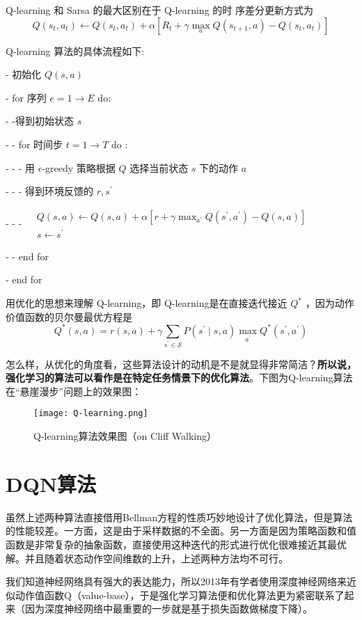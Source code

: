 Q-learning 和 Sarsa 的最大区别在于 Q-learning 的时 序差分更新方式为
$$
Q\left(s_{t}, a_{t}\right) \leftarrow Q\left(s_{t}, a_{t}\right)+\alpha\left[R_{t}+\gamma \max _{a} Q\left(s_{t+1}, a\right)-Q\left(s_{t}, a_{t}\right)\right]
$$

Q-learning 算法的具体流程如下:

- 初始化 $Q(s, a)$

- for 序列 $e=1 \rightarrow E$ do:

- -得到初始状态 $s$

- - for 时间步 $t=1 \rightarrow T$ do :

- - - 用 $\epsilon$-greedy 策略根据 $Q$ 选择当前状态 $s$ 下的动作 $a$

- - - 得到环境反馈的 $r, s^{\prime}$

- - - $\begin{array}{ll} & Q(s, a) \leftarrow Q(s, a)+\alpha\left[r+\gamma \max _{a^{\prime}} Q\left(s^{\prime}, a^{\prime}\right)-Q(s, a)\right] \\ & s \leftarrow s^{\prime}\end{array}$

- - end for

- end for

用优化的思想来理解 Q-learning，即 Q-learning是在直接迭代接近 $Q^{*}$ ，因为动作价值函数的贝尔曼最优方程是
$$
Q^{*}(s, a)=r(s, a)+\gamma \sum_{s^{\prime} \in \mathcal{S}} P\left(s^{\prime} \mid s, a\right) \max _{a^{\prime}} Q^{*}\left(s^{\prime}, a^{\prime}\right)
$$

怎么样，从优化的角度看，这些算法设计的动机是不是就显得非常简洁？\textbf{所以说，强化学习的算法可以看作是在特定任务情景下的优化算法}。下图为Q-learning算法在“悬崖漫步”问题上的效果图：
\begin{figure}[hbt]
    \centering
    \texttt{[image: Q-learning.png]}
	\vspace{-0.5cm}
    \caption{Q-learning算法效果图（on Cliff Walking）}
    \label{Q-learning}
\end{figure}
\section{DQN算法}
虽然上述两种算法直接借用Bellman方程的性质巧妙地设计了优化算法，但是算法的性能较差。一方面，这是由于采样数据的不全面。另一方面是因为策略函数和值函数是非常复杂的抽象函数，直接使用这种迭代的形式进行优化很难接近其最优解。并且随着状态动作空间维数的上升，上述两种方法均不可行。

我们知道神经网络具有强大的表达能力，所以2013年有学者使用深度神经网络来近似动作值函数Q（value-base），于是强化学习算法便和优化算法更为紧密联系了起来（因为深度神经网络中最重要的一步就是基于损失函数做梯度下降\cite{王珏2006机器学习及其应用}）。

